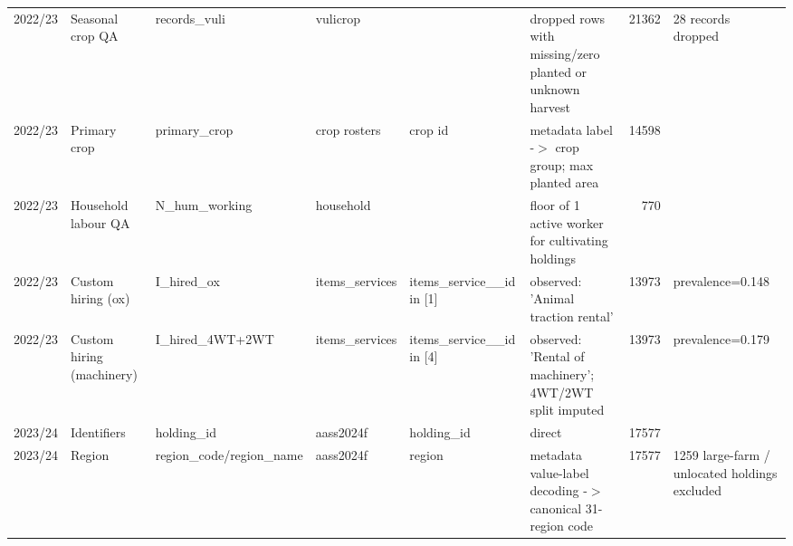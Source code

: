 \begin{tabular}{llllllrl}
 2022/23         & Seasonal crop QA          & records\_vuli              & vulicrop                         &                                           & dropped rows with missing/zero planted or unknown harvest                                                    &   21362 & 28 records dropped                                                                             \\
 2022/23         & Primary crop              & primary\_crop              & crop rosters                     & crop id                                   & metadata label -\ensuremath{>} crop group; max planted area                                                               &   14598 &                                                                                                \\
 2022/23         & Household labour QA       & N\_hum\_working             & household                        &                                           & floor of 1 active worker for cultivating holdings                                                            &     770 &                                                                                                \\
 2022/23         & Custom hiring (ox)        & I\_hired\_ox                & items\_services                   & items\_service\_\_id in [1]                  & observed: 'Animal traction rental'                                                                           &   13973 & prevalence=0.148                                                                               \\
 2022/23         & Custom hiring (machinery) & I\_hired\_4WT+2WT           & items\_services                   & items\_service\_\_id in [4]                  & observed: 'Rental of machinery'; 4WT/2WT split imputed                                                       &   13973 & prevalence=0.179                                                                               \\
 2023/24         & Identifiers               & holding\_id                & aass2024f                        & holding\_id                                & direct                                                                                                       &   17577 &                                                                                                \\
 2023/24         & Region                    & region\_code/region\_name   & aass2024f                        & region                                    & metadata value-label decoding -\ensuremath{>} canonical 31-region code                                                    &   17577 & 1259 large-farm / unlocated holdings excluded                                                  \\

\end{tabular}
